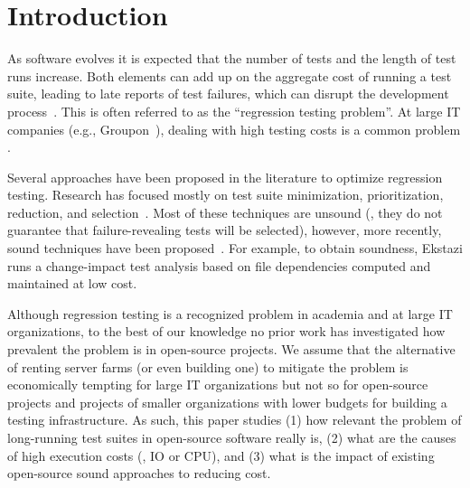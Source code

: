 \section{Introduction}

As software evolves it is expected that the number of tests and the
length of test runs increase.  Both elements can add up on the
aggregate cost of running a test suite, leading to late reports of test
failures, which can disrupt the development
process~\cite{hilton-etal-ase2016}.  This is often referred to as the
``regression testing problem''.  At large IT companies (e.g.,
Groupon~\cite{kim-etal-fse2013}), dealing with high testing costs is a
common problem .  

Several approaches have been proposed in the literature to optimize
regression testing.  Research has focused mostly on test suite
minimization, prioritization, reduction, and
selection~\cite{yoo-harman-stvr2012}.  Most of these techniques are
unsound (\ie{}, they do not guarantee that failure-revealing tests
will be selected), however, more recently, sound techniques have been
proposed~\cite{gligoric-etal-issta2015,soetens-etal-2016}.  For
example, to obtain soundness,
Ekstazi\cite{ekstazi-web,gligoric-etal-issta2015} runs a change-impact
test analysis based on file dependencies computed and maintained at
low cost.

Although regression testing is a recognized problem in academia and at
large IT organizations, to the best of our knowledge no prior work has
investigated how prevalent the problem is in open-source projects.  We
assume that the alternative of renting server farms (or even building
one) to mitigate the problem is economically tempting for large IT
organizations but not so for open-source projects and projects of
smaller organizations with lower budgets for building a testing
infrastructure.  As such, this paper studies (1) how relevant the
problem of long-running test suites in open-source software really is,
(2) what are the causes of high execution costs (\eg{}, IO or CPU),
and (3) what is the impact of existing open-source sound approaches to
reducing cost.

\Fix{--------------}

